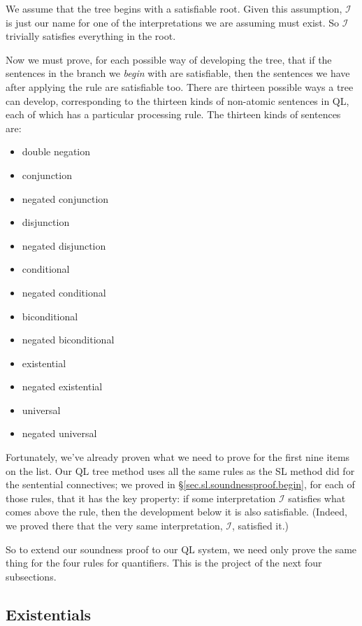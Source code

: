 We assume that the tree begins with a satisfiable root. Given this assumption, $\mathcal{I}$ is just our name for one of the interpretations we are assuming must exist. So $\mathcal{I}$ trivially satisfies everything in the root.

Now we must prove, for each possible way of developing the tree, that if the sentences in the branch we \emph{begin} with are satisfiable, then the sentences we have after applying the rule are satisfiable too. There are thirteen possible ways a tree can develop, corresponding to the thirteen kinds of non-atomic sentences in QL, each of which has a particular processing rule. The thirteen kinds of sentences are:

\begin{itemize}
\item double negation
\item conjunction
\item negated conjunction
\item disjunction
\item negated disjunction
\item conditional
\item negated conditional
\item biconditional
\item negated biconditional
\item existential
\item negated existential
\item universal
\item negated universal
\end{itemize}

Fortunately, we've already proven what we need to prove for the first nine items on the list. Our QL tree method uses all the same rules as the SL method did for the sentential connectives; we proved in \S\ref{sec.sl.soundnessproof.begin}, for each of those rules, that it has the key property: if some interpretation $\mathcal{I}$ satisfies what comes above the rule, then the development below it is also satisfiable. (Indeed, we proved there that the very same interpretation, $\mathcal{I}$, satisfied it.)

So to extend our soundness proof to our QL system, we need only prove the same thing for the four rules for quantifiers. This is the project of the next four subsections.

\subsection{Existentials}

